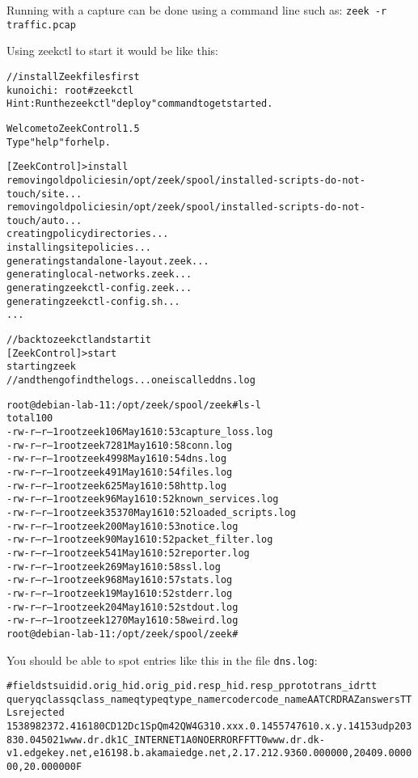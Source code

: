 \documentclass[a4paper,11pt,notitlepage]{report}
\begin{document}
Running with a capture can be done using a command line such as:
\verb+zeek -r traffic.pcap+

Using zeekctl to start it would be like this:
\begin{alltt}\small
// install Zeek files first
kunoichi:~ root# zeekctl
Hint: Run the zeekctl "deploy" command to get started.

Welcome to ZeekControl 1.5
Type "help" for help.

[ZeekControl] > install
removing old policies in /opt/zeek/spool/installed-scripts-do-not-touch/site ...
removing old policies in /opt/zeek/spool/installed-scripts-do-not-touch/auto ...
creating policy directories ...
installing site policies ...
generating standalone-layout.zeek ...
generating local-networks.zeek ...
generating zeekctl-config.zeek ...
generating zeekctl-config.sh ...
...
\end{alltt}

\begin{alltt}\small
// back to zeekctl and start it
[ZeekControl] > start
starting zeek
// and then go find the logs ... one is called dns.log

root@debian-lab-11:/opt/zeek/spool/zeek# ls -l
total 100
-rw-r--r-- 1 root zeek   106 May 16 10:53 capture_loss.log
-rw-r--r-- 1 root zeek  7281 May 16 10:58 conn.log
-rw-r--r-- 1 root zeek  4998 May 16 10:54 dns.log
-rw-r--r-- 1 root zeek   491 May 16 10:54 files.log
-rw-r--r-- 1 root zeek   625 May 16 10:58 http.log
-rw-r--r-- 1 root zeek    96 May 16 10:52 known_services.log
-rw-r--r-- 1 root zeek 35370 May 16 10:52 loaded_scripts.log
-rw-r--r-- 1 root zeek   200 May 16 10:53 notice.log
-rw-r--r-- 1 root zeek    90 May 16 10:52 packet_filter.log
-rw-r--r-- 1 root zeek   541 May 16 10:52 reporter.log
-rw-r--r-- 1 root zeek   269 May 16 10:58 ssl.log
-rw-r--r-- 1 root zeek   968 May 16 10:57 stats.log
-rw-r--r-- 1 root zeek    19 May 16 10:52 stderr.log
-rw-r--r-- 1 root zeek   204 May 16 10:52 stdout.log
-rw-r--r-- 1 root zeek  1270 May 16 10:58 weird.log
root@debian-lab-11:/opt/zeek/spool/zeek#
\end{alltt}

You should be able to spot entries like this in the file \verb+dns.log+:
\begin{alltt}\small
#fields ts      uid     id.orig_h       id.orig_p       id.resp_h       id.resp_p       proto   trans_id        rtt
     query   qclass  qclass_name     qtype   qtype_name      rcode   rcode_name      AA      TC      RD      RA      Z       answers TTLs    rejected
1538982372.416180	CD12Dc1SpQm42QW4G3	10.xxx.0.145	57476	10.x.y.141	53	udp	20383	0.045021	www.dr.dk	1	C_INTERNET	1	A	0	NOERROR	F	F	T	T	0	www.dr.dk-v1.edgekey.net,e16198.b.akamaiedge.net,2.17.212.93	60.000000,20409.000000,20.000000	F
\end{alltt}
\end{document}
